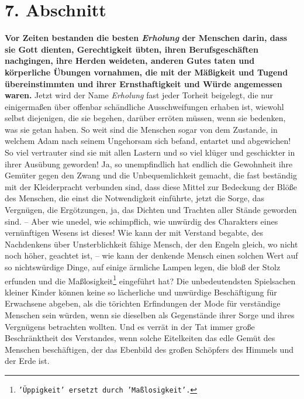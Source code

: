 \section{7. Abschnitt} \label{kap14_ab7}

\label{ref:14_07_wahre_nachfolger_erholung}
 \textbf{Vor Zeiten bestanden die
besten \textit{Erholung} der Menschen darin, dass sie Gott
dienten, Gerechtigkeit übten, ihren Berufsgeschäften nachgingen, ihre Herden
weideten, anderen Gutes taten und körperliche Übungen vornahmen, die mit der
Mäßigkeit und Tugend übereinstimmten und ihrer Ernsthaftigkeit und Würde
angemessen waren.} Jetzt wird der Name \textit{Erholung} fast jeder Torheit
beigelegt, die nur einigermaßen über offenbar schändliche Ausschweifungen
erhaben ist, wiewohl selbst diejenigen, die sie begehen, darüber erröten
müssen, wenn sie bedenken, was sie getan haben. So weit sind die Menschen sogar
von dem Zustande, in welchem Adam nach seinem Ungehorsam
sich befand, entartet
und abgewichen! So viel vertrauter sind sie mit allen Lastern und so viel klüger
und geschickter in ihrer Ausübung geworden! Ja, so unempfindlich hat endlich die
Gewohnheit ihre Gemüter gegen den Zwang und die Unbequemlichkeit gemacht, die
fast beständig mit der Kleiderpracht verbunden sind, dass diese Mittel zur
Bedeckung der Blöße des Menschen, die einst die Notwendigkeit einführte, jetzt
die Sorge, das Vergnügen, die Ergötzungen, ja, das Dichten und Trachten aller
Stände geworden sind. -- Aber wie unedel, wie schimpflich, wie unwürdig des
Charakters eines vernünftigen Wesens ist dieses! Wie kann der mit Verstand
begabte, des Nachdenkens über Unsterblichkeit fähige Mensch, der den
Engeln
gleich, wo nicht noch höher, geachtet ist, -- wie kann der denkende Mensch einen
solchen Wert auf so nichtswürdige Dinge, auf einige ärmliche Lampen legen, die
bloß der Stolz erfunden und die Maßlosigkeit\footnote{\texttt{'Üppigkeit' ersetzt
durch 'Maßlosigkeit'.}}
eingeführt hat? Die unbedeutendsten
Spielsachen kleiner Kinder können keine so lächerliche und
unwürdige
Beschäftigung für Erwachsene abgeben, als die törichten Erfindungen der Mode
für verständige Menschen sein würden, wenn sie dieselben als Gegenstände ihrer
Sorge und ihres Vergnügens betrachten wollten. Und es verrät in der Tat immer
große Beschränktheit des Verstandes, wenn solche Eitelkeiten das edle Gemüt des
Menschen beschäftigen, der das Ebenbild des großen Schöpfers des Himmels und der
Erde ist.

